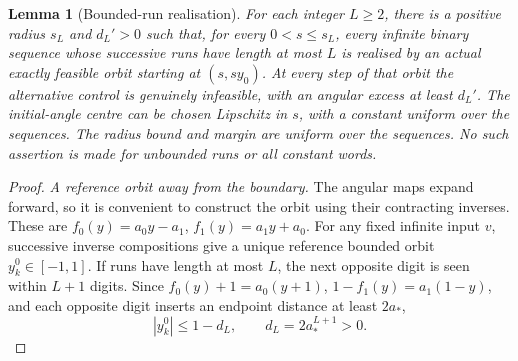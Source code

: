\documentclass[11pt]{amsart}
\newtheorem{lemma}[theorem]{Lemma}
\theoremstyle{definition}
\theoremstyle{remark}
\numberwithin{equation}{section}
\begin{document}
\begin{lemma}[Bounded-run realisation]\label{lem:shadow}
For each integer \(L\ge2\), there is a positive radius \(s_L\)
and \(d_L'>0\) such that, for every \(0<s\le s_L\), every
infinite binary sequence whose successive runs have length at most
\(L\) is realised by an actual exactly feasible orbit starting at
\((s,sy_0)\).
At every step of that orbit the alternative control is genuinely
infeasible, with an angular excess at least \(d_L'\).
The initial-angle centre can be chosen Lipschitz in \(s\), with a
constant uniform over the sequences. The radius bound and margin are
uniform over the sequences. No such
assertion is made for unbounded runs or all constant words.

\end{lemma}
\begin{proof}
\emph{A reference orbit away from the boundary.}
The angular maps expand forward, so it is convenient to construct
the orbit using their contracting inverses. These are
\(f_0(y)=a_0y-a_1\), \(f_1(y)=a_1y+a_0\).
For any fixed infinite input \(v\), successive inverse compositions
give a unique reference bounded orbit \(y_k^0\in[-1,1]\).
If runs have length at most \(L\), the next opposite digit is seen
within \(L+1\) digits. Since
\(f_0(y)+1=a_0(y+1)\), \(1-f_1(y)=a_1(1-y)\), and each opposite
digit inserts an endpoint distance at least \(2a_*\),
\begin{equation}
|y_k^0|\le1-d_L,
              \qquad d_L=2a_*^{L+1}>0.                     \label{eq:refmargin}
\end{equation}


\end{proof}
\end{document}

